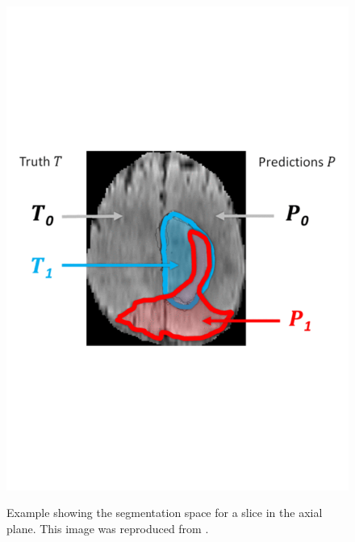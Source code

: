 \documentclass[12pt,a4paper,twoside,openright]{report}
\begin{document}
\begin{figure}[h]
	\centering
	\includegraphics[scale = 0.5]{example_evaluation}
	\label{fig:evaluation_example}
	\caption[Example showing the segmentation space for a slice in the axial plane.]{Example showing the segmentation space for a slice in the axial plane. This image was reproduced from \cite{brats-proceedings}.}
\end{figure}
\end{document}
